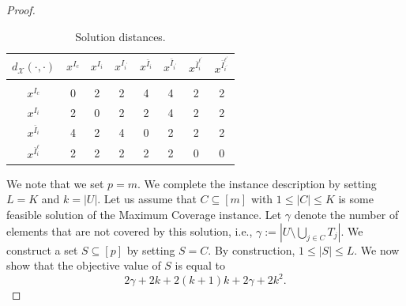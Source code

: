 \documentclass[11pt, a4paper]{article}
\newcommand{\FRil}[1]{\todo[color=black, textcolor=white, inline, author=FR]{#1}}
\newcommand{\MHil}[1]{\todo[color=gray, textcolor=yellow, inline, author=MH]{#1}}
\newcommand{\X}{{\mathcal{X}}} %
\newcommand{\instanceindex}{i}
\newcommand{\instanceindextwo}{j}
\newcommand{\fsel}{S} %
\newcommand{\x}{{x}}
\newcommand{\soldist}[1][(\instanceindex,\instanceindextwo)]{d_\X#1} %
\begin{document}
\begin{proof}
\begin{table}[H]
\centering
\begin{tabular}{c|ccccccc}
$\soldist[(\cdot,\cdot)]$ & $\x^{I_c}$ & $\x^{I_{i}}$ & $\x^{I_{i^\prime}}$ & $\x^{\bar{I}_{i}}$ & $\x^{\bar{I}_{i^\prime}}$ & $\x^{\bar{I}_{i}^{\ell^\prime}}$ & $\x^{\bar{I}_{i^\prime}^{\ell^\prime}}$\\
\hline\\[-2ex]
$\x^{I_c}$       &  0 & 2 & 2 & 4 & 4 & 2 & 2\\
$\x^{I_i}$       & 2 & 0 & 2 & 2 & 4 & 2 & 2 \\
$\x^{\bar{I}_i}$ & 4 & 2 & 4 & 0 & 2 & 2 & 2 \\
$\x^{\bar{I}_i^\ell}$ & 2 & 2 & 2 & 2 & 2 & 0 & 0
\end{tabular}
\vspace{.3cm}
\caption{Solution distances. }\label{table:sol_dist}
\end{table}

We note that we set $p=m$.
We complete the instance description by setting $L=K$ and $k=|U|$.
Let us assume that $C\subseteq[m]$ with $1\le|C|\le K$ is some feasible solution of the Maximum Coverage instance. Let $\gamma$ denote the number of elements that are not covered by this solution, i.e., $\gamma := |U \setminus \bigcup_{j \in C}T_j|$. We construct a set $\fsel\subseteq[p]$ by setting $\fsel = C$. By construction, $1\le|\fsel|\le L$. We now show that the objective value of $\fsel$ is equal to
\begin{equation}
2\gamma + 2k + 2(k+1)k + 2\gamma + 2k^2. \label{eq:npcobj}
\end{equation}


\end{proof}
\end{document}
